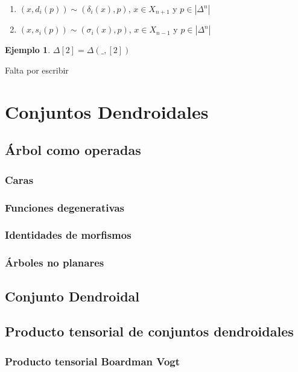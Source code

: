 \documentclass[11pt,a4paper,openright,oneside]{article}
\numberwithin{equation}{section}
\theoremstyle{definition}
\newtheorem{ex}[teo]{Ejemplo}
\begin{document}
\begin{enumerate}[(1)]
    \item $(x, d_i(p)) \sim (\delta_i(x), p)$, $x\in X_{n+1}$ y $p\in|\Delta^n|$
    \item $(x, s_i(p)) \sim (\sigma_i(x), p)$, $x\in X_{n-1}$ y $p\in|\Delta^n|$
\end{enumerate}

\begin{ex}
    $\Delta[2] = \Delta(\_, [2])$
\end{ex}
Falta por escribir



\section{Conjuntos Dendroidales}
\subsection{\'Arbol como operadas}
\subsubsection{Caras}
\subsubsection{Funciones degenerativas}
\subsubsection{Identidades de morfismos}
\subsubsection{\'Arboles no planares}
\subsection{Conjunto Dendroidal}
\subsection{Producto tensorial de conjuntos dendroidales}
\subsubsection{Producto tensorial Boardman Vogt}
\end{document}
